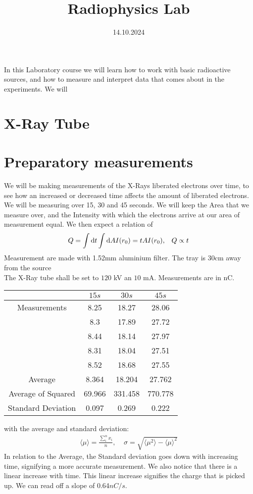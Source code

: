\documentclass[]{scrartcl}
\title{Radiophysics Lab}
\author{}
\date{14.10.2024}
\begin{document}
\maketitle
\newpage
\tableofcontents
\newpage

In this Laboratory course we will learn how to work with basic radioactive sources, and how to measure and interpret data that comes about in the experiments. We will 


\section{X-Ray Tube}


\section{Preparatory measurements}

We will be making measurements of the X-Rays liberated electrons over time, to see how an increased or decreased time affects the amount of liberated electrons. We will be measuring over 15, 30 and 45 seconds. We will keep the Area that we measure over, and the Intensity with which the electrons arrive at our area of measurement equal. We then expect a relation of
\begin{equation}
	Q = \int \text dt\int \text dA I(r_0) = tAI(r_0),\;\;\; Q \propto t
\end{equation}
Measurement are made with 1.52mm aluminium filter. The tray is 30cm away from the source\\
The X-Ray tube shall be set to $120$ kV an $10$ mA. Measurements are in nC.

\begin{center}
	\begin{tabular}{||c||c|c|c||}
	\hline
		 & $15s$ & $30s$ & $45s$\\
	\hline
		Measurements & 8.25 & 18.27 & 28.06 \\
		     	& 8.3 & 17.89 & 27.72 \\
			& 8.44 & 18.14 & 27.97\\
			& 8.31 & 18.04 & 27.51\\
			& 8.52 & 18.68 & 27.55\\
	\hline
		Average & 8.364 & 18.204 & 27.762\\
	\hline
		Average of Squared & 69.966 & 331.458 & 770.778\\
	\hline
		Standard Deviation & 0.097 & 0.269 & 0.222\\
	\hline
	\end{tabular}
\end{center}
with the average and standard deviation:
\begin{gather}
	\langle\mu\rangle = \frac{\sum_i^n x_i}{n},\;\;\;\;
	\sigma = \sqrt{\langle\mu^2\rangle - \langle\mu\rangle^2}
\end{gather}
In relation to the Average, the Standard deviation goes down with increasing time, signifying a more accurate measurement. We also notice that there is a linear increase with time. This linear increase signifies the charge that is picked up. We can read off a slope of 0.64$nC/s$.
\end{document}
